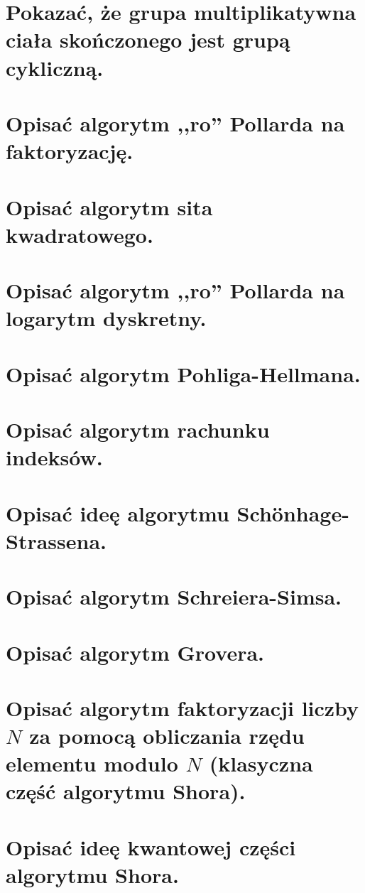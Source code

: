 \section{Pokazać, że grupa multiplikatywna ciała skończonego jest grupą cykliczną.}


\section{Opisać algorytm ,,ro'' Pollarda na faktoryzację.}
\label{C:rho_factorization}


\section{Opisać algorytm sita kwadratowego.}


\section{Opisać algorytm ,,ro'' Pollarda na logarytm dyskretny.}



\section{Opisać algorytm Pohliga-Hellmana.}


\newpage
\section{Opisać algorytm rachunku indeksów.}


\section{Opisać ideę algorytmu Sch{\"o}nhage-Strassena.}


\section{Opisać algorytm Schreiera-Simsa.}


\newpage
\section{Opisać algorytm Grovera.}


\section{Opisać algorytm faktoryzacji liczby \( N \) za pomocą obliczania rzędu elementu modulo \( N \) (klasyczna część algorytmu Shora).}


\section{Opisać ideę kwantowej części algorytmu Shora.}
